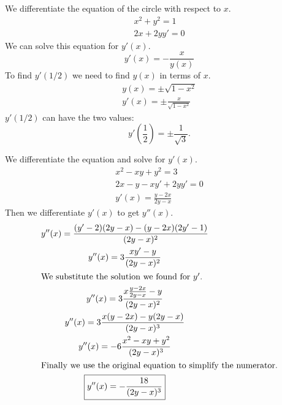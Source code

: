 



\begin{Solution}
  \label{solution tangent circle}
  We differentiate the equation of the circle with respect to $x$.
  \begin{gather*}
    x^2 + y^2 = 1
    \\
    2 x + 2 y y' = 0
  \end{gather*}
  We can solve this equation for $y'(x)$.
  \[
  y'(x) = - \frac{x}{y(x)}
  \]
  To find $y'(1/2)$ we need to find $y(x)$ in terms of $x$.
  \begin{gather*}
    y(x) = \pm \sqrt{1 - x^2}
    \\
    y'(x) = \pm \frac{x}{\sqrt{1 - x^2}}
  \end{gather*}
  $y'(1/2)$ can have the two values:
  \[
  \boxed{
    y' \left( \frac{1}{2} \right) = \pm \frac{1}{\sqrt{3}}.
    }
  \]
\end{Solution}






\begin{Solution}
  \label{solution y' y'' circle}
  We differentiate the equation and solve for $y'(x)$.
  \begin{gather*}
    x^2 - x y + y^2 = 3
    \\
    2 x - y - x y' + 2 y y' = 0
    \\
    \boxed{
      y'(x) = \frac{y - 2 x}{2 y - x}
    }
  \end{gather*}
  Then we differentiate $y'(x)$ to get $y''(x)$.
  \begin{gather*}
    y''(x) = \frac{(y' - 2)(2 y - x) - (y - 2 x)(2y' - 1)}{(2 y - x)^2}
    \\
    y''(x) = 3 \frac{x y' - y }{(2 y - x)^2}
    \\
    \intertext{We substitute the solution we found for $y'$.}
    y''(x) = 3 \frac{x \frac{y - 2 x}{2 y - x} - y}{(2 y - x)^2}
    \\
    y''(x) = 3 \frac{x (y - 2 x) - y (2 y - x) }{(2 y - x)^3}
    \\
    y''(x) = - 6 \frac{x^2 - x y + y^2}{(2 y - x)^3}
    \\
    \intertext{Finally we use the original equation to simplify the numerator.}
    \boxed{
      y''(x) =  - \frac{18}{(2 y - x)^3}
    }
  \end{gather*}
\end{Solution}



